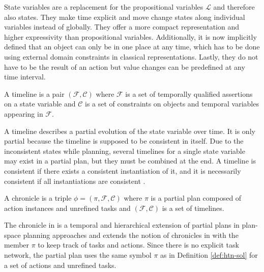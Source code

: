 State variables are a replacement for the propositional variables $\mathcal{L}$ and therefore also states.
They make time explicit and move change states along individual variables instead of globally.
They offer a more compact representation and higher expressivity than propositional variables.
Additionally, it is now implicitly defined that an object can only be in one place at any time, which has to be done using external domain constraints in classical representations. 
Lastly, they do not have to be the result of an action but value changes can be predefined at any time interval.

\begin{definition}[Timeline]
  A timeline is a pair $(\mathcal{F},\mathcal{C})$ where $\mathcal{F}$ is a set of temporally qualified assertions on a state variable and $\mathcal{C}$ is a set of constraints on objects and temporal variables appearing in $\mathcal{F}$.
\end{definition}
A timeline describes a partial evolution of the state variable over time.
It is only partial because the timeline is supposed to be consistent in itself.
Due to the inconsistent states while planning, several timelines for a single state variable may exist in a partial plan, but they must be combined at the end.
A timeline is consistent if there exists a consistent instantiation of it, and it is necessarily consistent if all instantiations are consistent \cite{bit-monnotTemporalHierarchicalModels2016a}.


\begin{definition}[Chronicle]
  A chronicle is a triple $\phi = (\pi,\mathcal{F},\mathcal{C})$ where $\pi$ is a partial plan composed of action instances and unrefined tasks and $(\mathcal{F},\mathcal{C})$ is a set of timelines.
\end{definition}
The chronicle in \cite{bit-monnotFAPEConstraintbasedPlanner2020} is a temporal and hierarchical extension of partial plans in plan-space planning approaches \citep[chap.~5]{ghallabAutomatedPlanningTheory2004} and extends the notion of chronicles in \cite[sec.~4.2.4]{ghallabAutomatedPlanningActing2016} with the member $\pi$ to keep track of tasks and actions.
Since there is no explicit task network, the partial plan uses the same symbol $\pi$ as in Definition \ref{def:htn-sol} for a set of actions and unrefined tasks.



